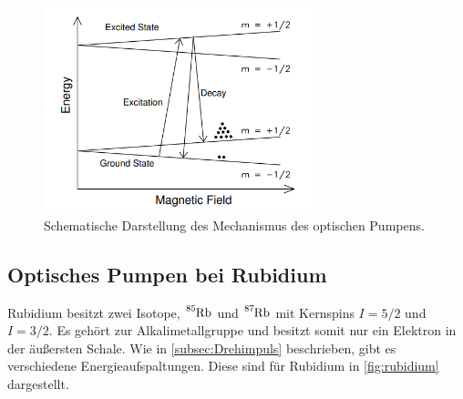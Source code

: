 \begin{figure}[H]
    \centering
    \includegraphics[width=0.7\textwidth]{images/optisches_pumpen.png}
    \caption{Schematische Darstellung des Mechanismus des optischen Pumpens. \cite{optical_pumping_princeton}}
    \label{fig:optisches_pumpen}
\end{figure}

\subsection{Optisches Pumpen bei Rubidium}
\label{subsec:Rubidium}

Rubidium besitzt zwei Isotope, $\ce{^{85}Rb}$ und $\ce{^{87}Rb}$ mit Kernspins $I = 5/2$ und $I = 3/2$. Es gehört zur Alkalimetallgruppe und besitzt somit nur ein Elektron in der äußersten Schale.
Wie in \autoref{subsec:Drehimpuls} beschrieben, gibt es verschiedene Energieaufspaltungen. Diese sind für Rubidium in \autoref{fig:rubidium} dargestellt.

